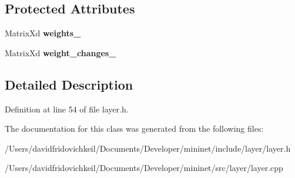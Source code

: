 \subsection*{Protected Attributes}
\begin{DoxyCompactItemize}
\item 
\hypertarget{classmininet_1_1_layer_a9be2fab58f1a70c74b84c6fed4eac6c9}{}\label{classmininet_1_1_layer_a9be2fab58f1a70c74b84c6fed4eac6c9} 
Matrix\+Xd {\bfseries weights\+\_\+}
\item 
\hypertarget{classmininet_1_1_layer_a36fb12285a038b6d1afefe9ea29946dc}{}\label{classmininet_1_1_layer_a36fb12285a038b6d1afefe9ea29946dc} 
Matrix\+Xd {\bfseries weight\+\_\+changes\+\_\+}
\end{DoxyCompactItemize}


\subsection{Detailed Description}


Definition at line 54 of file layer.\+h.



The documentation for this class was generated from the following files\+:\begin{DoxyCompactItemize}
\item 
/\+Users/davidfridovichkeil/\+Documents/\+Developer/mininet/include/layer/layer.\+h\item 
/\+Users/davidfridovichkeil/\+Documents/\+Developer/mininet/src/layer/layer.\+cpp\end{DoxyCompactItemize}
